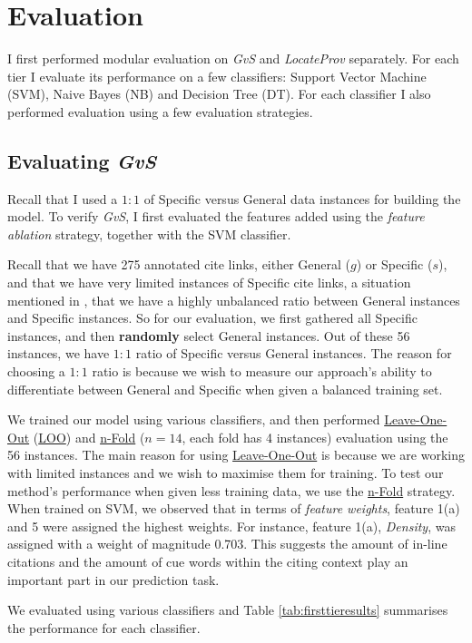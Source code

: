 \chapter{Evaluation}
\label{evaluation}
I first performed modular evaluation on {\it GvS} and {\it LocateProv} separately. For each tier I evaluate its performance on a few classifiers: Support Vector Machine (SVM), Naive Bayes (NB) and Decision Tree (DT). For each classifier I also performed evaluation using a few evaluation strategies.

\section{Evaluating {\it GvS}}
Recall that I used a $1:1$ of Specific versus General data instances for building the model. To verify {\it GvS}, I first evaluated the features added using the {\it feature ablation} strategy, together with the SVM classifier.

Recall that we have 275 annotated cite links, either General ($g$) or Specific ($s$), and that we have very limited instances of Specific cite links, a situation mentioned in \cite{li2010negative}, that we have a highly unbalanced ratio between General instances and Specific instances. So for our evaluation, we first gathered all Specific instances, and then \textbf{randomly} select General instances. Out of these 56 instances, we have $1:1$ ratio of Specific versus General instances. The reason for choosing a $1:1$ ratio is because we wish to measure our approach's ability to differentiate between General and Specific when given a balanced training set.

We trained our model using various classifiers, and then performed \url{Leave-One-Out} (\url{LOO}) and \url{n-Fold} ($n=14$, each fold has 4 instances) evaluation using the 56 instances. The main reason for using \url{Leave-One-Out} is because we are working with limited instances and we wish to maximise them for training. To test our method's performance when given less training data, we use the \url{n-Fold} strategy. When trained on SVM, we observed that in terms of \textit{feature weights}, feature 1(a) and 5 were assigned the highest weights. For instance, feature 1(a), \textit{Density}, was assigned with a weight of magnitude 0.703. This suggests the amount of in-line citations and the amount of cue words within the citing context play an important part in our prediction task.

We evaluated using various classifiers and Table \ref{tab:firsttieresults} summarises the performance for each classifier.

